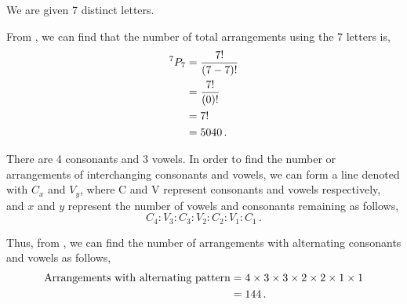 %
%


\begin{subquestions}
	
\subquestion

We are given 7 distinct letters.

\begin{subsubquestions}

\subsubquestion

From , we can find that the number of total arrangements using the 7 letters is,
\begin{align}
	^7P_7 & = \frac{7!}{(7-7)!} \nonumber \\
	      & = \frac{7!}{(0)!} \nonumber \\
	      & = 7! \nonumber \\
	      & = 5040 \,.
\end{align}
	

\subsubquestion

There are 4 consonants and 3 vowels. In order to find the number or arrangements of interchanging consonants and vowels, we can form a line denoted with $C_x$ and $V_y$, where C and V represent consonants and vowels respectively, and $x$ and $y$ represent the number of vowels and consonants remaining as follows,
\begin{equation}
	C_4:V_3:C_3:V_2:C_2:V_1:C_1 \,.
\end{equation}

Thus, from , we can find the number of arrangements with alternating consonants and vowels as follows,
\begin{align}
	\text{Arrangements with alternating pattern} & = 4 \times 3\times 3\times 2\times 2\times 1\times 1 \nonumber \\
	                                             & = 144 \,.
\end{align}


\end{subsubquestions}
\end{subquestions}
